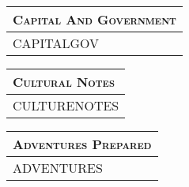 \documentclass[12pt,letterpaper,twocolumn]{article}
\begin{document}
\begin{tabularx}{\linewidth}{| X |}
    \multicolumn{1}{l}{\textsc{Capital And Government}} \\
    \hline
    CAPITALGOV \newline \newline \newline \newline \newline \newline \newline \newline \newline \newline         \\
    \hline
\end{tabularx}

\begin{tabularx}{\linewidth}{| X |}
    \multicolumn{1}{l}{\textsc{Cultural Notes}} \\
    \hline
    CULTURENOTES \newline \newline \newline \newline \newline \newline \newline \newline \newline  \newline \newline \newline \newline \newline \newline\\
    \hline
\end{tabularx}

\begin{tabularx}{\linewidth}{| X |}
    \multicolumn{1}{l}{\textsc{Adventures Prepared}} \\
    \hline
    ADVENTURES \newline \newline \newline \newline \newline  \newline \newline \newline \newline \newline         \\
    \hline
\end{tabularx}
\end{document}
